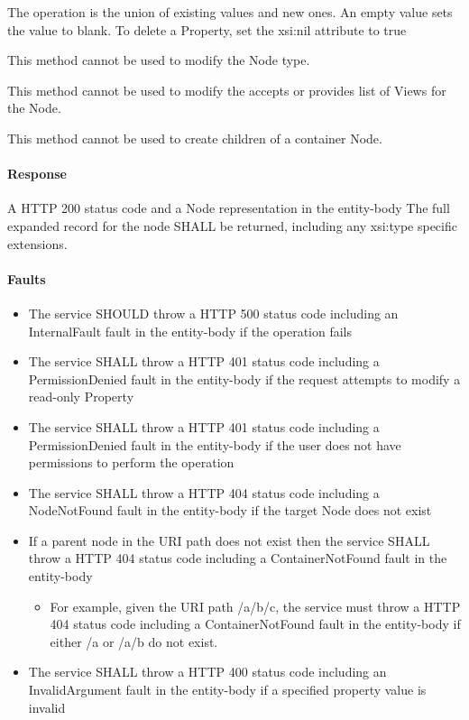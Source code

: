 \documentclass[11pt,a4paper]{ivoa}
\begin{document}
The operation is the union of existing values and new ones.  An empty value sets the value to blank.  To delete a Property, set the xsi:nil attribute to true

This method cannot be used to modify the Node type.

This method cannot be used to modify the accepts or provides list of Views for the Node.

This method cannot be used to create children of a container Node.

\paragraph{Response}
A HTTP 200 status code and a Node representation in the entity-body
The full expanded record for the node SHALL be returned, including any xsi:type specific extensions.

\paragraph{Faults}
\begin{itemize}
    \item The service SHOULD throw a HTTP 500 status code including an InternalFault fault in the entity-body if the operation fails
    \item The service SHALL throw a HTTP 401 status code including a PermissionDenied fault in the entity-body if the request attempts to modify a read-only Property
    \item The service SHALL throw a HTTP 401 status code including a PermissionDenied fault in the entity-body if the user does not have permissions to perform the operation
    \item The service SHALL throw a HTTP 404 status code including a NodeNotFound fault in the entity-body if the target Node does not exist
    \item If a parent node in the URI path does not exist then the service SHALL throw a HTTP 404 status code including a ContainerNotFound fault in the entity-body
    \begin{itemize}
        \item For example, given the URI path /a/b/c, the service must throw a HTTP 404 status code including a ContainerNotFound fault in the entity-body if either /a or /a/b do not exist.
    \end{itemize}
    \item The service SHALL throw a HTTP 400 status code including an InvalidArgument fault in the entity-body if a specified property value is invalid
\end{itemize}
\end{document}
